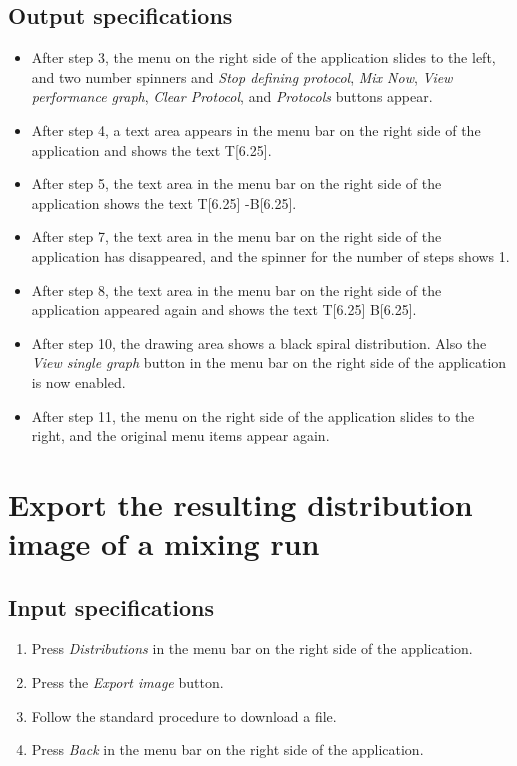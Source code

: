 \subsection*{Output specifications}
\begin{itemize}
\item After step 3, the menu on the right side of the application slides to the left, and two number spinners and \emph{Stop defining protocol}, \emph{Mix Now}, \emph{View performance graph}, \emph{Clear Protocol}, and \emph{Protocols} buttons appear.
\item After step 4, a text area appears in the menu bar on the right side of the application and shows the text T[6.25].
\item After step 5, the text area in the menu bar on the right side of the application shows the text T[6.25] -B[6.25].
\item After step 7, the text area in the menu bar on the right side of the application has disappeared, and the spinner for the number of steps shows 1.
\item After step 8, the text area in the menu bar on the right side of the application appeared again and shows the text T[6.25] B[6.25].
\item After step 10, the drawing area shows a black spiral distribution. Also the \emph{View single graph} button in the menu bar on the right side of the application is now enabled.
\item After step 11, the menu on the right side of the application slides to the right, and the original menu items appear again.
\end{itemize}

\section{Export the resulting distribution image of a mixing run}

\subsection*{Input specifications}
\begin{enumerate}
\item Press \emph{Distributions} in the menu bar on the right side of the application.
\item Press the \emph{Export image} button.
\item Follow the standard procedure to download a file.
\item Press \emph{Back} in the menu bar on the right side of the application.
\end{enumerate}

